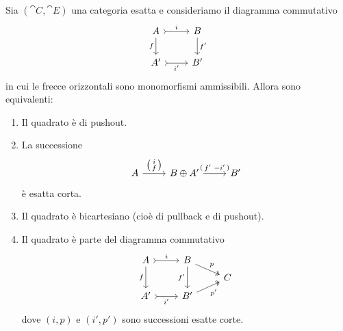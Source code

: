 \begin{proposition}\label{proposition:pushout-exact-bicart}
  Sia \((\cat C, \cat E)\) una categoria esatta e consideriamo il
  diagramma commutativo
  \[
    \begin{tikzcd}
      A \ar["{f}", d, swap] \ar["{i}", rightarrowtail, r] & B \ar["{f'}", d] \\
      A' \ar["{i'}", rightarrowtail, r, swap] & B'
    \end{tikzcd}
  \]
  in cui le frecce orizzontali sono monomorfismi ammissibili. Allora
  sono equivalenti:
  \begin{enumerate}[leftmargin=*, label=(\roman*), ref=(\roman*)]
  \item\label{item:1} Il quadrato è di pushout.
  \item\label{item:2} La successione
    \[
      \begin{tikzcd}[ampersand replacement=\&]
        A \ar["{\begin{psmallmatrix} i \\ f \end{psmallmatrix}}", r] \&
        B \oplus A' \ar["{\begin{psmallmatrix} f' &
            -i' \end{psmallmatrix}}", r] \& B'
      \end{tikzcd}
    \]
    è esatta corta.
  \item\label{item:3} Il quadrato è bicartesiano (cioè di pullback e di
    pushout).
  \item\label{item:4} Il quadrato è parte del diagramma commutativo
    \[
      \begin{tikzcd}[row sep=tiny]
        A \ar["{f}", dd, swap] \ar["{i}", rightarrowtail, r] & B
        \ar["{f'}", dd, swap]
        \ar["{p}", twoheadrightarrow, dr] \\
        & & C \\
        A' \ar["{i'}", rightarrowtail, r, swap] & B' \ar["{p'}",
        twoheadrightarrow, ur, swap]
      \end{tikzcd}
    \]
    dove \((i, p)\) e \((i', p')\) sono successioni esatte corte.
  \end{enumerate}
\end{proposition}

